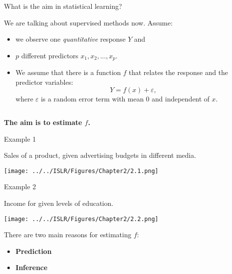 \documentclass[ignorenonframetext,]{beamer}
\providecommand{\tightlist}{%
  \setlength{\itemsep}{0pt}\setlength{\parskip}{0pt}}
\begin{document}
\begin{frame}

\begin{block}{What is the aim in statistical learning?}

\vspace{3mm}

We are talking about supervised methods now. Assume:

\vspace{2mm}

\begin{itemize}
\tightlist
\item
  we observe one \emph{quantitative} response \(Y\) and
\item
  \(p\) different predictors \(x_1, x_2,... , x_p\).
\item
  We assume that there is a function \(f\) that relates the response and
  the predictor variables: \[ Y = f(x) + \varepsilon,\] where
  \(\varepsilon\) is a random error term with mean 0 and independent of
  \(x\).
\end{itemize}

\(~\)

\centering
{\bf The aim is to estimate $f$.}

\end{block}

\end{frame}

\begin{frame}{Example 1}
\protect\hypertarget{example-1}{}

Sales of a product, given advertising budgets in different media.

\texttt{[image: ../../ISLR/Figures/Chapter2/2.1.png]}

\end{frame}

\begin{frame}{Example 2}
\protect\hypertarget{example-2}{}

\vspace{2mm}

Income for given levels of education.

\texttt{[image: ../../ISLR/Figures/Chapter2/2.2.png]}

\end{frame}

\begin{frame}

There are two main reasons for estimating \(f\):

\begin{itemize}
\item
  \textbf{Prediction}
\item
  \textbf{Inference}
\end{itemize}

\end{frame}
\end{document}
